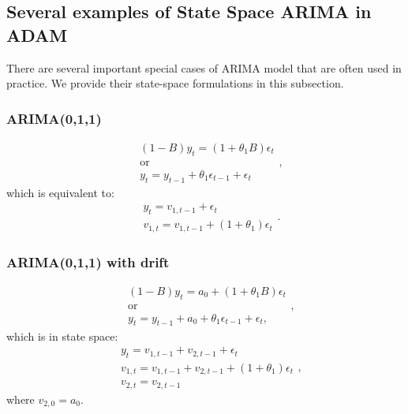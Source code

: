 \documentclass[
]{book}
\theoremstyle{definition}
\theoremstyle{definition}
\theoremstyle{definition}
\theoremstyle{definition}
\theoremstyle{remark}
\begin{document}
\hypertarget{ADAMARIMAExamplesModels}{%
\subsection{Several examples of State Space ARIMA in ADAM}\label{ADAMARIMAExamplesModels}}

There are several important special cases of ARIMA model that are often used in practice. We provide their state-space formulations in this subsection.

\hypertarget{arima011}{%
\subsubsection{ARIMA(0,1,1)}\label{arima011}}

\begin{equation*}
    \begin{aligned}
        &(1-B) y_t = (1+\theta_1 B)\epsilon_t \\
        &\text{or} \\
        &y_{t} = y_{t-1} + \theta_1 \epsilon_{t-1} + \epsilon_t
    \end{aligned},
\end{equation*}
which is equivalent to:
\begin{equation}
  \begin{aligned}
    &{y}_{t} = v_{1,t-1} + \epsilon_t \\
    &v_{1,t} = v_{1,t-1} + (1 + \theta_1) \epsilon_{t}
  \end{aligned}.
  \label{eq:ADAMARIMAExpanded011}
\end{equation}

\hypertarget{arima011-with-drift}{%
\subsubsection{ARIMA(0,1,1) with drift}\label{arima011-with-drift}}

\begin{equation*}
    \begin{aligned}
        &(1-B) y_t = a_0 + (1+\theta_1 B) \epsilon_t \\
        &\text{or} \\
        &y_{t} = y_{t-1} + a_0 + \theta_1 \epsilon_{t-1} + \epsilon_t,
    \end{aligned},
\end{equation*}
which is in state space:
\begin{equation}
  \begin{aligned}
    &{y}_{t} = v_{1,t-1} + v_{2,t-1} + \epsilon_t \\
    &v_{1,t} = v_{1,t-1} + v_{2,t-1} + (1 + \theta_1) \epsilon_{t} \\
    &v_{2,t} = v_{2,t-1}
  \end{aligned},
  \label{eq:ADAMARIMAExpanded011}
\end{equation}
where \(v_{2,0}=a_0\).
\end{document}
